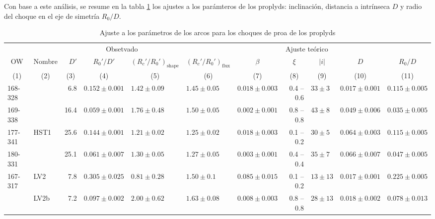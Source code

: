 Con base a este análisis, se resume en la tabla \ref{tab:arc-fits} los ajustes a los parámteros de los proplyds: inclinación, distancia a \thC{} intrínseca $D$ y radio del choque en el eje de simetría $R_0/D$.

\begin{table}
  \caption{Ajuste a los parámetros de los arcos para los choques de proa de los proplyds}
  \label{tab:arc-fits} 
\newcommand\C[1]{\multicolumn{1}{c}{#1}}
\begin{tabular}{llrllllrlll}\toprule
             &          & \multicolumn{3}{c}{\dotfill Obsetvado \dotfill}              & \multicolumn{6}{c}{\dotfill Ajuste teórico \dotfill} \\ 
  \C{OW}     & \C{Nombre} & \(D'\) &\C{ \(R_0'/D'\) }&\C{ \((R_c'/R_0')_{\mathrm{shape}}\) }&\C{ \((R_c'/R_0')_{\mathrm{flux}}\) }&\C{ \(\beta\) }&\C{ \(\xi\) }&\C{ \(|i|\) }&\C{ \(D\) }&\C{ \(R_0/D\)}\\
  \C{(1)}& \C{ (2) }&\C{ (3)    }&\C{    (4)      }&\C{              (5)           }&\C{           (6)             }&\C{     (7)   }&\C{   (8)   }&\C{   (9) }&\C{  (10) }&\C{   (11)} \\
\midrule     
 168-328  &            &    6.8  &  $0.152 \pm 0.001$  &  $1.42 \pm 0.09$   &  $1.45 \pm 0.05$     &  $0.018 \pm 0.003$  &  0.4 -- 0.6  &  $33 \pm 3$   &  $0.017 \pm 0.001$  &  $0.115 \pm 0.005$  \\
 169-338  &            &  16.4  &  $0.059 \pm 0.001$  &  $1.76 \pm 0.48$   &  $1.50 \pm 0.05$     &  $0.002 \pm 0.001$  &  0.8 -- 0.8  &  $43 \pm 8$   &  $0.049 \pm 0.006$  &  $0.035 \pm 0.005$  \\
 177-341  & HST1   & 25.6  &  $0.144 \pm 0.001$  &  $1.21 \pm 0.02$   &  $1.25 \pm 0.02$     &  $0.018 \pm 0.003$  &  0.1 -- 0.2  &  $30 \pm 5$   &  $0.064 \pm 0.003$  &  $0.115 \pm 0.005$  \\
 180-331  &             &  25.1  &  $0.061 \pm 0.007$  &  $1.30 \pm 0.05$   &  $1.27 \pm 0.05$     &  $0.003 \pm 0.001$  &  0.4 -- 0.4  &  $35 \pm 7$   &  $0.066 \pm 0.007$  &  $0.047 \pm 0.005$  \\
 167-317  &  LV2     &    7.8  &  $0.305 \pm 0.025$  &  $0.81 \pm 0.28$   &  $1.50 \pm 0.1$      &  $0.085 \pm 0.015$  &  0.1 -- 0.2  &  $13 \pm 13$  &  $0.017 \pm 0.001$  &  $0.225 \pm 0.005$  \\
               & LV2b    &   7.2  &  $0.097 \pm 0.002$  &  $2.00 \pm 0.62$   &  $1.63 \pm 0.08$     &  $0.008 \pm 0.003$  &  0.8 -- 0.8  &  $28 \pm 13$  &  $0.018 \pm 0.002$  &  $0.078 \pm 0.013$  \\

\end{tabular}
\end{table}
